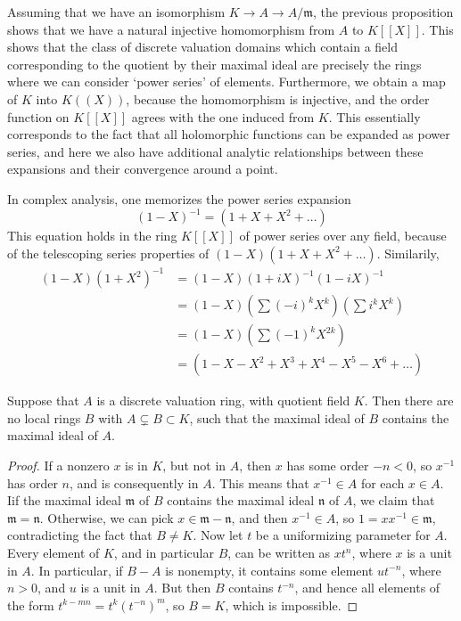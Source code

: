 Assuming that we have an isomorphism $K \to A \to A/\mathfrak{m}$, the previous proposition shows that we have a natural injective homomorphism from $A$ to $K[[X]]$. This shows that the class of discrete valuation domains which contain a field corresponding to the quotient by their maximal ideal are precisely the rings where we can consider `power series' of elements. Furthermore, we obtain a map of $K$ into $K((X))$, because the homomorphism is injective, and the order function on $K[[X]]$ agrees with the one induced from $K$. This essentially corresponds to the fact that all holomorphic functions can be expanded as power series, and here we also have additional analytic relationships between these expansions and their convergence around a point.

\begin{example}
    In complex analysis, one memorizes the power series expansion
    \[ (1-X)^{-1} = (1 + X + X^2 + \dots) \]
    This equation holds in the ring $K[[X]]$ of power series over any field, because of the telescoping series properties of $(1-X)(1 + X + X^2 + \dots)$. Similarily,
    \begin{align*}
        (1-X)(1 + X^2)^{-1} &= (1-X)(1 + iX)^{-1}(1 - iX)^{-1}\\
        &= (1-X) \left( \sum (-i)^k X^k \right) \left( \sum i^k X^k \right)\\
        &= (1-X) \left( \sum (-1)^k X^{2k} \right)\\
        &= (1 - X - X^2 + X^3 + X^4 - X^5 - X^6 + \dots)
    \end{align*}
\end{example}

\begin{prop}
    Suppose that $A$ is a discrete valuation ring, with quotient field $K$. Then there are no local rings $B$ with $A \subsetneq B \subset K$, such that the maximal ideal of $B$ contains the maximal ideal of $A$.
\end{prop}
\begin{proof}
    If a nonzero $x$ is in $K$, but not in $A$, then $x$ has some order $-n < 0$, so $x^{-1}$ has order $n$, and is consequently in $A$. This means that $x^{-1} \in A$ for each $x \in A$. Iif the maximal ideal $\mathfrak{m}$ of $B$ contains the maximal ideal $\mathfrak{n}$ of $A$, we claim that $\mathfrak{m} = \mathfrak{n}$. Otherwise, we can pick $x \in \mathfrak{m} - \mathfrak{n}$, and then $x^{-1} \in A$, so $1 = xx^{-1} \in \mathfrak{m}$, contradicting the fact that $B \neq K$. Now let $t$ be a uniformizing parameter for $A$. Every element of $K$, and in particular $B$, can be written as $xt^n$, where $x$ is a unit in $A$. In particular, if $B - A$ is nonempty, it contains some element $ut^{-n}$, where $n > 0$, and $u$ is a unit in $A$. But then $B$ contains $t^{-n}$, and hence all elements of the form $t^{k-mn} = t^k(t^{-n})^m$, so $B = K$, which is impossible.
\end{proof}

